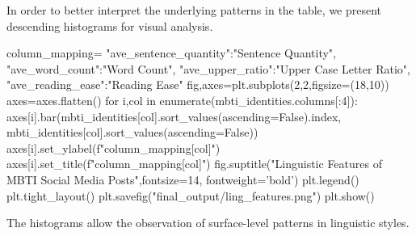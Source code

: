 \documentclass[12pt]{article}
\begin{document}
	In order to better interpret the underlying patterns in the table, we present descending histograms for visual analysis.
	\begin{python}
column_mapping={
    "ave_sentence_quantity":"Sentence Quantity",
    "ave_word_count":"Word Count",
    "ave_upper_ratio":"Upper Case Letter Ratio",
    "ave_reading_ease":"Reading Ease"
}
fig,axes=plt.subplots(2,2,figsize=(18,10))
axes=axes.flatten()
for i,col in enumerate(mbti_identities.columns[:4]):
    axes[i].bar(mbti_identities[col].sort_values(ascending=False).index, mbti_identities[col].sort_values(ascending=False))
    axes[i].set_ylabel(f"{column_mapping[col]}")
    axes[i].set_title(f"{column_mapping[col]}")
fig.suptitle("Linguistic Features of MBTI Social Media Posts",fontsize=14, fontweight='bold')
plt.legend()
plt.tight_layout()
plt.savefig("final_output/ling_features.png")
plt.show()
	\end{python}
\begin{figure}[H]
    \centering
\end{figure}
	The histograms allow the observation of surface-level patterns in linguistic styles.
\end{document}
